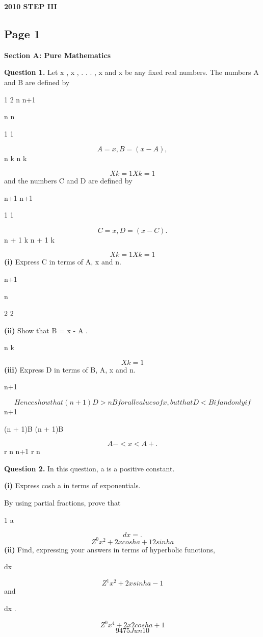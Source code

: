 \documentclass[12pt]{article}
\begin{document}
\begin{center}
{\Large \textbf{2010 STEP III}}
\end{center}

\subsection*{Page 1}
\begin{flushleft}
\bigskip\textbf{Section A: Pure Mathematics}\par
\bigskip\textbf{Question 1.} Let x , x , . . . , x and x be any fixed real numbers. The numbers A and B are defined by\par
1 2 n n+1\par
n n\par
1 1\par
\[A = x , B = (x - A) ,\]
n k n k\par
\[Xk=1 Xk=1\]
and the numbers C and D are defined by\par
n+1 n+1\par
1 1\par
\[C = x , D = (x - C) .\]
n + 1 k n + 1 k\par
\[Xk=1 Xk=1\]
\textbf{(i)} Express C in terms of A, x and n.\par
n+1\par
n\par
2 2\par
\textbf{(ii)} Show that B = x - A .\par
n k\par
\[Xk=1\]
\textbf{(iii)} Express D in terms of B, A, x and n.\par
n+1\par
\[Hence show that (n + 1)D > nB for all values of x , but that D < B if and only if\]
n+1\par
(n + 1)B (n + 1)B\par
\[A - < x < A + .\]
r n n+1 r n\par
\bigskip\textbf{Question 2.} In this question, a is a positive constant.\par
\textbf{(i)} Express cosh a in terms of exponentials.\par
By using partial fractions, prove that\par
1 a\par
\[dx = .\]
\[Z^0 x^2 + 2x cosh a + 1 2 sinh a\]
\textbf{(ii)} Find, expressing your answers in terms of hyperbolic functions,\par
\infty\par
dx\par
\[Z^1 x^2 + 2x sinh a - 1\]
and\par
\infty\par
dx .\par
\[Z^0 x^4 + 2x2 cosh a + 1\]
\[9475 Jun10\]
\end{flushleft}
\end{document}
